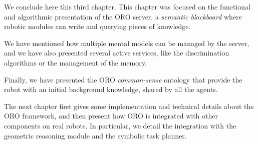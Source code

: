 
\recap

We conclude here this third chapter. This chapter was focused on the functional
and algorithmic presentation of the ORO server, a \emph{semantic blackboard}
where robotic modules can write and querying pieces of knowledge.

We have mentioned how multiple mental models can be managed by the server, and
we have also presented several active services, like the discrimination
algorithms or the management of the memory.

Finally, we have presented the ORO \emph{common-sense} ontology that provide
the robot with an initial background knowledge, shared by all the agents.

The next chapter first gives some implementation and technical details about
the ORO framework, and then present how ORO is integrated with other components
on real robots. In particular, we detail the integration with the geometric
reasoning module and the symbolic task planner.


